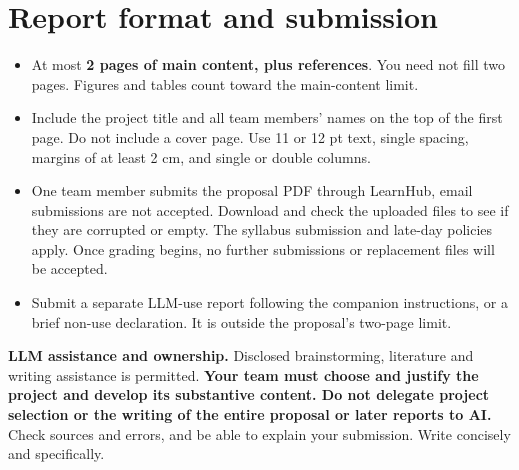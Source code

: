 \documentclass{article}
\begin{document}
\section*{Report format and submission}
\begin{itemize}[leftmargin=*,itemsep=2pt]
\item At most \textbf{2 pages of main content, plus references}. You need not fill two pages. Figures and tables count toward the main-content limit.
\item Include the project title and all team members' names on the top of the first page. Do not include a cover page. Use 11 or 12 pt text, single spacing, margins of at least 2 cm, and single or double columns.
\item One team member submits the proposal PDF through LearnHub, email submissions are not accepted. Download and check the uploaded files to see if they are corrupted or empty. The syllabus submission and late-day policies apply. Once grading begins, no further submissions or replacement files will be accepted.
\item Submit a separate LLM-use report following the companion instructions, or a brief non-use declaration. It is outside the proposal's two-page limit.
\end{itemize}

\noindent\textbf{LLM assistance and ownership.} Disclosed brainstorming, literature and writing assistance is permitted. \textbf{Your team must choose and justify the project and develop its substantive content. Do not delegate project selection or the writing of the entire proposal or later reports to AI.} Check sources and errors, and be able to explain your submission. Write concisely and specifically.
\end{document}
